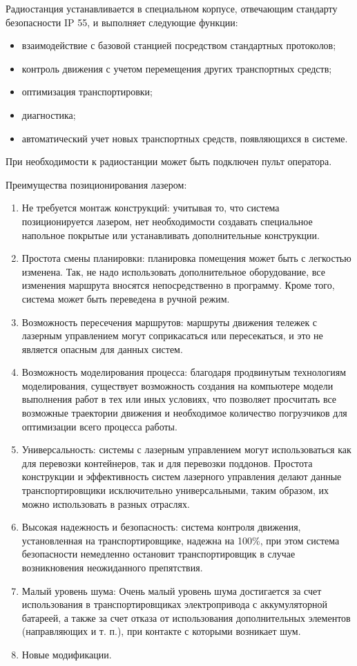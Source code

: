 Радиостанция устанавливается в специальном корпусе, отвечающим стандарту безопасности IP 55, и выполняет следующие функции:

\begin{itemize}
    \item взаимодействие с базовой станцией посредством стандартных протоколов;
    \item контроль движения с учетом перемещения других транспортных средств;
    \item оптимизация транспортировки;
    \item диагностика;
    \item автоматический учет новых транспортных средств, появляющихся в системе.
\end{itemize}

При необходимости к радиостанции может быть подключен пульт оператора.

Преимущества позиционирования лазером:

\begin{enumerate}
    \item Не требуется монтаж конструкций: учитывая то, что система позиционируется лазером, нет необходимости создавать специальное напольное покрытые или устанавливать дополнительные конструкции.
    \item Простота смены планировки: планировка помещения может быть с легкостью изменена. Так, не надо использовать дополнительное оборудование, все изменения маршрута вносятся непосредственно в программу. Кроме того, система может быть переведена в ручной режим.
    \item Возможность пересечения маршрутов: маршруты движения тележек с лазерным управлением могут соприкасаться или пересекаться, и это не является опасным для данных систем.
    \item Возможность моделирования процесса: благодаря продвинутым технологиям моделирования, существует возможность создания на компьютере модели выполнения работ в тех или иных условиях, что позволяет просчитать все возможные траектории движения и необходимое количество погрузчиков для оптимизации всего процесса работы.
    \item Универсальность: системы с лазерным управлением могут использоваться как для перевозки контейнеров, так и для перевозки поддонов. Простота конструкции и эффективность систем лазерного управления делают данные транспортировщики исключительно универсальными, таким образом, их можно использовать в разных отраслях.
    \item Высокая надежность и безопасность: система контроля движения, установленная на транспортировщике, надежна на 100\%, при этом система безопасности немедленно остановит транспортировщик в случае возникновения неожиданного препятствия.
    \item Малый уровень шума: Очень малый уровень шума достигается за счет использования в транспортировщиках электропривода с аккумуляторной батареей, а также за счет отказа от использования дополнительных элементов (направляющих и т. п.), при контакте с которыми возникает шум.
    \item Новые модификации.
\end{enumerate}

